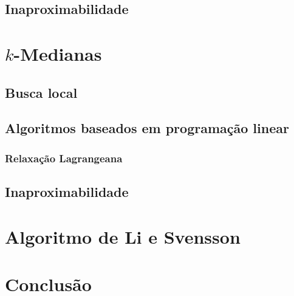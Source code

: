 \documentclass[12pt]{article}
\begin{document}
\subsection{Inaproximabilidade}
    
    
\section{$k$-Medianas}
    

\subsection{Busca local}
    
    
\subsection{Algoritmos baseados em programação linear}
    

\subsubsection{Relaxação Lagrangeana}
\label{k-median:RelLag}
    

\subsection{Inaproximabilidade}
    
\newpage
\section{Algoritmo de Li e Svensson}
    
\section{Conclusão}


\end{document}
